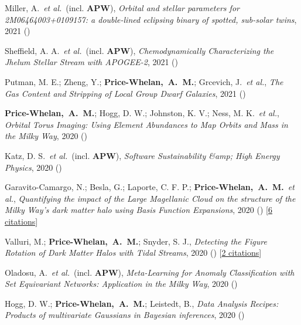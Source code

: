 \item[{\color{deemph}\scriptsize15}]Miller, A.~\textit{et al.}~(incl. \textbf{APW}), \textit{Orbital and stellar parameters for 2M06464003+0109157: a double-lined eclipsing binary of spotted, sub-solar twins}, 2021 ()

\item[{\color{deemph}\scriptsize14}]Sheffield, A. A.~\textit{et al.}~(incl. \textbf{APW}), \textit{Chemodynamically Characterizing the Jhelum Stellar Stream with APOGEE-2}, 2021 ()

\item[{\color{deemph}\scriptsize13}]Putman, M. E.; Zheng, Y.; \textbf{Price-Whelan,~A.~M.}; Grcevich, J.~\textit{et al.}, \textit{The Gas Content and Stripping of Local Group Dwarf Galaxies}, 2021 ()

\item[{\color{deemph}\scriptsize12}]\textbf{Price-Whelan,~A.~M.}; Hogg, D. W.; Johnston, K. V.; Ness, M. K.~\textit{et al.}, \textit{Orbital Torus Imaging: Using Element Abundances to Map Orbits and Mass in the Milky Way}, 2020 ()

\item[{\color{deemph}\scriptsize11}]Katz, D. S.~\textit{et al.}~(incl. \textbf{APW}), \textit{Software Sustainability {\&}amp; High Energy Physics}, 2020 ()

\item[{\color{deemph}\scriptsize10}]Garavito-Camargo, N.; Besla, G.; Laporte, C. F. P.; \textbf{Price-Whelan,~A.~M.}~\textit{et al.}, \textit{Quantifying the impact of the Large Magellanic Cloud on the structure of the Milky Way's dark matter halo using Basis Function Expansions}, 2020 () [\href{http://adsabs.harvard.edu/abs/2020arXiv201000816G}{6 citations}]

\item[{\color{deemph}\scriptsize9}]Valluri, M.; \textbf{Price-Whelan,~A.~M.}; Snyder, S. J., \textit{Detecting the Figure Rotation of Dark Matter Halos with Tidal Streams}, 2020 () [\href{http://adsabs.harvard.edu/abs/2020arXiv200909004V}{2 citations}]

\item[{\color{deemph}\scriptsize8}]Oladosu, A.~\textit{et al.}~(incl. \textbf{APW}), \textit{Meta-Learning for Anomaly Classification with Set Equivariant Networks: Application in the Milky Way}, 2020 ()

\item[{\color{deemph}\scriptsize7}]Hogg, D. W.; \textbf{Price-Whelan,~A.~M.}; Leistedt, B., \textit{Data Analysis Recipes: Products of multivariate Gaussians in Bayesian inferences}, 2020 ()

